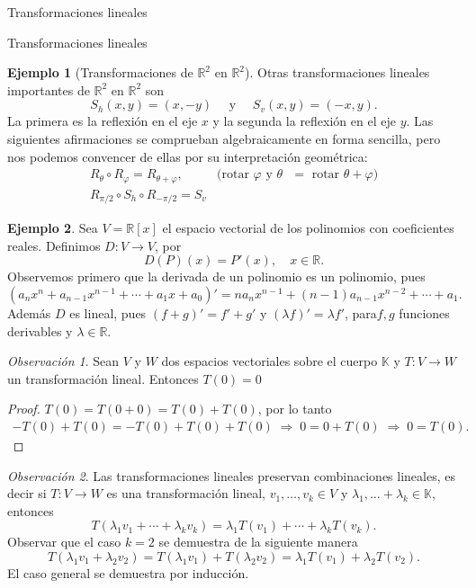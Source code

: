 \documentclass[a4paper,12pt,twoside,spanish,reqno]{amsbook}
\theoremstyle{definition}
\newtheorem{ejemplo}{Ejemplo}[section]
\theoremstyle{remark}
\newtheorem{obs}{Observaci\'on}[section]
\newcommand{\R}{\mathbb R}
\newcommand{\K}{\mathbb K}
\begin{document}
\begin{chapter}{Transformaciones lineales}
\begin{section}{Transformaciones lineales}
\begin{ejemplo}[Transformaciones de $\R^2$ en $\R^2$]
				
				
				Otras transformaciones lineales importantes de $\R^2$ en $\R^2$ son 
				$$
				S_h(x,y) = (x,-y) \quad \text{ y } \quad S_v(x,y) = (-x,y).
				$$
				La primera es la reflexión en el eje $x$ y la segunda la reflexión en el eje $y$. Las siguientes afirmaciones se comprueban algebraicamente en forma sencilla, pero nos podemos convencer de ellas por su interpretación geométrica:
				\begin{equation*}
				\begin{array}{ll}
				R_\theta \circ R_\varphi = R_{\theta +\varphi}, \quad &\text{(rotar $\varphi$ y $\theta$ $=$  rotar $\theta+\varphi$)} \\
				R_{\pi/2} \circ S_h \circ R_{-\pi/2} = S_v&
				\end{array}
				\end{equation*}
				
			\end{ejemplo}
	
		
			\begin{ejemplo}
			Sea $V = \R[x]$ el espacio vectorial de los polinomios con coeficientes reales. Definimos $D:V \to V$, por
			$$
			D(P)(x) = P'(x),\quad x \in \R. 
			$$
			Observemos primero que la derivada de un polinomio es un polinomio, pues 
			$$
			(a_nx^n+ a_{n-1}x^{n-1}+\cdots + a_1 x + a_0)' = na_nx^{n-1}+ (n-1)a_{n-1}x^{n-2}+\cdots + a_1.
			$$
			Además  $D$  es lineal, pues $(f+g)' = f' + g'$ y $(\lambda f)' = \lambda f'$, para$f,g$ funciones derivables y $\lambda \in \R$.
			\end{ejemplo} 
		
		\begin{obs}	Sean $V$ y $W$ dos espacios vectoriales sobre el cuerpo $\K$ y 	 $T:V \to W$			un transformación lineal. Entonces $T(0) =0$
		\end{obs}
		\begin{proof} $T(0) = T(0+0) = T(0) + T(0)$, por lo tanto 
			\begin{align*}
				-T(0) + T(0) = -T(0) + T(0)+T(0) \;\Rightarrow\; 0 = 0 +T(0) \;\Rightarrow\; 0= T(0).
			\end{align*}
		\end{proof}
		
		\begin{obs}
			Las transformaciones lineales preservan  combinaciones lineales, es decir si $T:V \to W$ es una transformación lineal, $ v_1,\ldots,v_k \in V$ y $\lambda_1, \ldots+ \lambda_k \in \K$,  entonces
			$$
			T(\lambda_1 v_1 + \cdots+ \lambda_k v_k) = \lambda_1 T(v_1) + \cdots+ \lambda_k T(v_k).
			$$
			Observar que el caso $k=2$ se demuestra de la siguiente manera
			$$
			T(\lambda_1 v_1 +  \lambda_2 v_2) =T(\lambda_1 v_1) + T(\lambda_2 v_2) =\lambda_1 T(v_1) + \lambda_2T( v_2).
			$$
			El caso general se demuestra por inducción. 
		

\end{obs}
\end{section}
\end{chapter}
\end{document}
